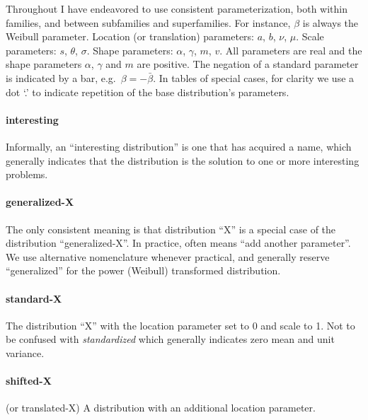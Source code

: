 Throughout I have endeavored to use consistent parameterization, both within families, and between subfamilies and superfamilies. For instance, $\beta$ is always the Weibull parameter. Location (or translation) parameters: $a$, $b$, $\nu$, $\mu$. Scale parameters: $s$, $\theta$, $\sigma$. Shape parameters: $\alpha$, $\gamma$, $m$, $v$. All parameters are real and the shape parameters $\alpha$, $\gamma$ and $m$ are positive. The negation of a standard parameter is indicated by a bar, e.g.\ $\beta = -\bar{\beta}$. 
In tables of special cases, for clarity we use a dot `.' to indicate repetition of the base distribution's parameters. 



 
 
\paragraph*{interesting}  Informally, an ``interesting distribution'' is one that has acquired a name, which generally indicates that the distribution is the solution to one or more interesting problems.

\paragraph*{generalized-X}  The only consistent meaning is that distribution ``X'' is a special case of the distribution ``generalized-X''.  In practice, often means ``add another parameter''.  We use alternative nomenclature whenever practical, and generally reserve ``generalized'' for the power (Weibull) transformed distribution. 

\paragraph*{standard-X}   The distribution ``X'' with the location parameter set to 0 and scale to 1. Not to be confused with {\it standardized} which generally indicates zero mean and unit variance. 

\paragraph*{shifted-X}  (or translated-X) A distribution with an additional location parameter. 

